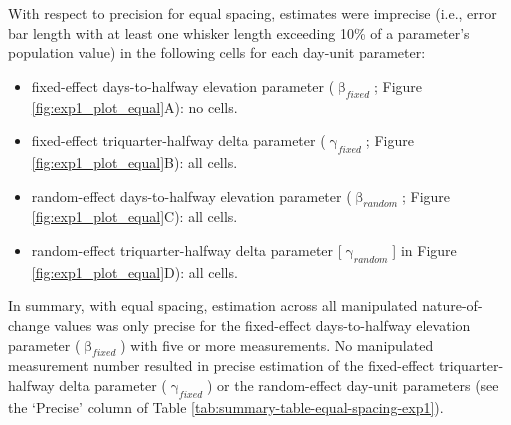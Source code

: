\documentclass[
12pt, %
twoside,
english]{guelphthesis}
\begin{document}
With respect to precision for equal spacing, estimates were imprecise (i.e., error bar length with at least one whisker length exceeding 10\% of a parameter's population value) in the following cells for each day-unit parameter:
\begin{itemize}
\tightlist
\item
  fixed-effect days-to-halfway elevation parameter (\(\upbeta_{fixed}\); Figure \ref{fig:exp1_plot_equal}A): no cells.
\item
  fixed-effect triquarter-halfway delta parameter (\(\upgamma_{fixed}\); Figure \ref{fig:exp1_plot_equal}B): all cells.
\item
  random-effect days-to-halfway elevation parameter (\(\upbeta_{random}\); Figure \ref{fig:exp1_plot_equal}C): all cells.
\item
  random-effect triquarter-halfway delta parameter {[}\(\upgamma_{random}\){]} in Figure \ref{fig:exp1_plot_equal}D): all cells.
\end{itemize}
In summary, with equal spacing, estimation across all manipulated nature-of-change values was only precise for the fixed-effect days-to-halfway elevation parameter (\(\upbeta_{fixed}\)) with five or more measurements. No manipulated measurement number resulted in precise estimation of the fixed-effect triquarter-halfway delta parameter (\(\upgamma_{fixed}\)) or the random-effect day-unit parameters (see the `Precise' column of Table \ref{tab:summary-table-equal-spacing-exp1}).
\end{document}
